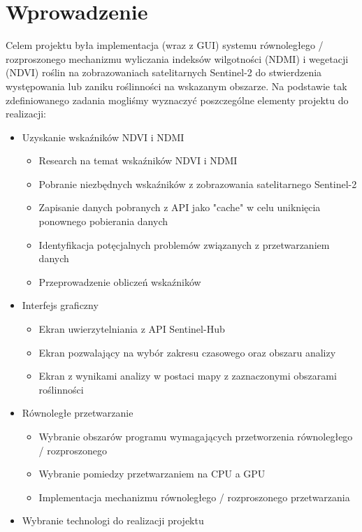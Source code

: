 \documentclass[12pt,a4paper]{article}
\begin{document}
\section{Wprowadzenie}
Celem projektu była implementacja (wraz z GUI) systemu równoległego / rozproszonego mechanizmu wyliczania indeksów wilgotności (NDMI) i wegetacji (NDVI) roślin na zobrazowaniach satelitarnych Sentinel-2 do stwierdzenia występowania lub zaniku roślinności na wskazanym obszarze.
Na podstawie tak zdefiniowanego zadania mogliśmy wyznaczyć poszczególne elementy projektu do realizacji:
\begin{itemize}
    \item Uzyskanie wskaźników NDVI i NDMI
    \begin{itemize}
        \item Research na temat wskaźników NDVI i NDMI
        \item Pobranie niezbędnych wskaźników z zobrazowania satelitarnego Sentinel-2
        \item Zapisanie danych pobranych z API jako "cache" w celu uniknięcia ponownego pobierania danych
        \item Identyfikacja potęcjalnych problemów związanych z przetwarzaniem danych
        \item Przeprowadzenie obliczeń wskaźników
    \end{itemize}
    \item Interfejs graficzny
    \begin{itemize}
        \item Ekran uwierzytelniania z API Sentinel-Hub
        \item Ekran pozwalający na wybór zakresu czasowego oraz obszaru analizy
        \item Ekran z wynikami analizy w postaci mapy z zaznaczonymi obszarami roślinności
    \end{itemize}
    \item Równoległe przetwarzanie
    \begin{itemize}
        \item Wybranie obszarów programu wymagających przetworzenia równoległego / rozproszonego
        \item Wybranie pomiedzy przetwarzaniem na CPU a GPU
        \item Implementacja mechanizmu równoległego / rozproszonego przetwarzania
    \end{itemize}
    \item Wybranie technologi do realizacji projektu
\end{itemize}
\end{document}

